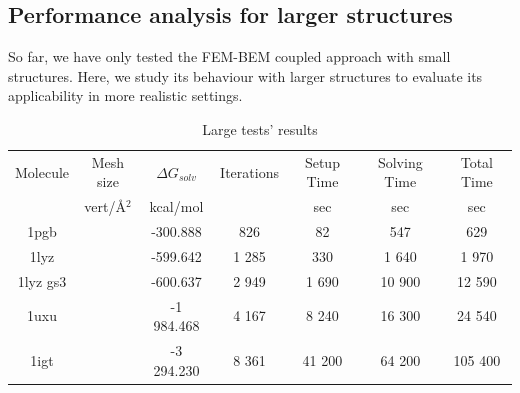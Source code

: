 \subsection*{\sffamily \large Performance analysis for larger structures}

So far, we have only tested the FEM-BEM coupled approach with small structures. Here, we study its behaviour with larger structures to evaluate its applicability in more realistic settings.


\begin{table}
\centering
\begin{tabular}{c|c|c|c|c|c|c}
Molecule & Mesh size  & $\Delta G_{solv}$ & Iterations & Setup Time & Solving Time & Total Time \\
& vert/\AA$^2$ &  kcal/mol & & sec & sec & sec \\
\hline
 1pgb &  & -300.888 & 826 & 82 & 547 & 629  \\
 1lyz &  & -599.642 & 1 285 & 330 & 1 640  & 1 970  \\
 1lyz gs3 & & -600.637 & 2 949  & 1 690 & 10 900 & 12 590   \\
 1uxu &  & -1 984.468 & 4 167 & 8 240 & 16 300 & 24 540  \\
 1igt &  &  -3 294.230 & 8 361 & 41 200 & 64 200 &  105 400   \\
 \hline
\end{tabular}
\caption{Large tests' results}
\label{table:large_variable}
\end{table}
